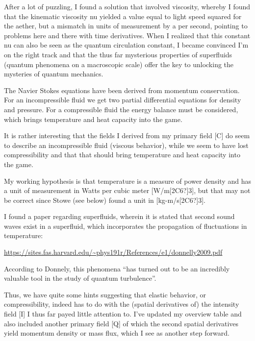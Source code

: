 \documentclass[a4paper]{article}
\newcommand\textstyleNone[1]{#1}
\begin{document}
{\color[rgb]{0.101960786,0.101960786,0.101960786}
\textstyleNone{After a lot of puzzling, I found a solution that involved viscosity, whereby I found that the kinematic
viscosity nu yielded a value equal to light speed squared for the aether, but a mismatch in units of measurement by a
per second, pointing to problems here and there with time derivatives. When I realized that this constant nu can also
be seen as the quantum circulation constant, I became convinced I'm on the right track and that the thus far mysterious
properties }\textstyleNone{of superfluids (quantum phenomena on a macroscopic scale) offer the key to unlocking the
mysteries of quantum mechanics.}}

{\color[rgb]{0.101960786,0.101960786,0.101960786}
\textstyleNone{{\textquotedbl}The Navier Stokes equations have been derived from momentum conservation. For an
incompressible fluid we get two partial differential equations for density and pressure. For a compressible fluid the
energy balance must be considered, which brings temperature and heat capacity into the game.{\textquotedbl}}}

{\color[rgb]{0.101960786,0.101960786,0.101960786}
\textstyleNone{It is rather interesting that the fields I derived from my primary field [C] do seem to describe an
incompressible fluid (viscous behavior), while we seem to have lost compressibility and that that should bring
temperature and heat capacity into the game.}}

\textstyleNone{{My working hypothesis is that temperature is a
measure of power density and has a unit of measurement in Watts per cubic meter [W/m[2C6?]3]}, but that may not be
correct since Stowe (see below) found a unit in [kg-m/s[2C6?]3]. {
}}

{\color[rgb]{0.101960786,0.101960786,0.101960786}
\textstyleNone{I found a paper regarding superfluids, wherein it is stated that {\textquotedbl}second
sound{\textquotedbl} waves exist in a superfluid, which incorporates the propagation of fluctuations in temperature:}}

{\color[rgb]{0.101960786,0.101960786,0.101960786}
\url{https://sites.fas.harvard.edu/~phys191r/References/e1/donnelly2009.pdf}\textstyleNone{ }}

{\color[rgb]{0.101960786,0.101960786,0.101960786}
\textstyleNone{According to Donnely, this phenomena ``has turned out to be an incredibly valuable tool in the study of
quantum turbulence''.  }}

{\color[rgb]{0.101960786,0.101960786,0.101960786}
\textstyleNone{Thus, we have quite some hints suggesting that elastic behavior, or compressibility, indeed has to do
with the (spatial derivatives of) the intensity field [I] I thus far payed little attention to. I've updated my
overview table and also included another primary field [Q] of which the second spatial derivatives yield momentum
density or mass flux, which I see as another step forward.}}
\end{document}
